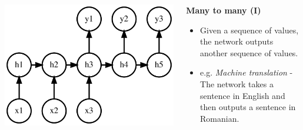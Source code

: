 \documentclass{beamer}
\begin{document}
\begin{frame}[allowframebreaks]
\begin{columns}
    \begin{column}{0.4\textwidth}
      \includegraphics[height=0.4\textheight]{../img/many-to-many-1.png}
    \end{column}
    \begin{column}{0.6\textwidth}
      \begin{center}
        \textbf{Many to many (I)}
      \end{center}
      \begin{itemize}
        \item Given a sequence of values, the network outputs another sequence of values.
        \item e.g. \textit{Machine translation} - The network takes a sentence in English and then outputs a sentence in Romanian.
      \end{itemize}
    \end{column}
  \end{columns}
  \framebreak
  \begin{columns}
    \begin{column}{0.3\textwidth}

\end{column}
\end{columns}
\end{frame}
\end{document}
